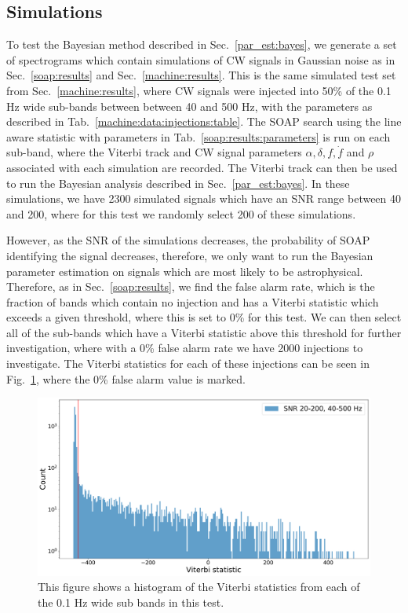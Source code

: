 \subsection{\label{par_est:results:simulations}Simulations}
%
%
To test the Bayesian method described in Sec.~\ref{par_est:bayes}, we generate a
set of spectrograms which contain simulations of \gls{CW} signals in Gaussian noise as in Sec.~\ref{soap:results} and
Sec.~\ref{machine:results}.  This is the same simulated test set from
Sec.~\ref{machine:results}, where \gls{CW} signals were injected into 50\% of
the 0.1 Hz wide sub-bands between between 40 and 500 Hz, with the parameters as
described in Tab.~\ref{machine:data:injections:table}.  The SOAP search using
the line aware statistic with parameters in Tab.~\ref{soap:results:parameters}
is run on each sub-band, where the Viterbi track and \gls{CW} signal parameters
$\alpha, \delta, f, \dot{f}$ and $\rho$ associated with each
simulation are recorded.  The Viterbi track can then be used to run the
Bayesian analysis described in Sec.~\ref{par_est:bayes}.  In these simulations,
we have 2300 simulated signals which have an \gls{SNR} range between 40 and
200, where for this test we randomly select 200 of these simulations.

\if
However, as the \gls{SNR} of the simulations decreases, the probability of SOAP identifying the signal decreases, therefore, we only want to run the Bayesian parameter estimation on signals which are most likely to be astrophysical.
Therefore, as in Sec.~\ref{soap:results}, we find the false alarm rate, which is the fraction of bands which contain no injection and has a Viterbi statistic which exceeds a given threshold, where this is set to 0\% for this test.
We can then select all of the sub-bands which have a Viterbi statistic above this threshold for further investigation, where with a 0\% false alarm rate we have 2000  injections to investigate.
The Viterbi statistics for each of these injections can be seen in Fig.~\ref{par_est:results:all_viterbi}, where the 0\% false alarm value is marked.
%
\begin{figure}
    \centering
    \includegraphics[width=\linewidth]{C5_parameter/viterbi_hist.pdf}
    \caption[All Viterbi statistics]{This figure shows a histogram of the Viterbi statistics from each of the 0.1 Hz wide sub bands in this test. }
    \label{par_est:results:all_viterbi}
\end{figure}
\fi


